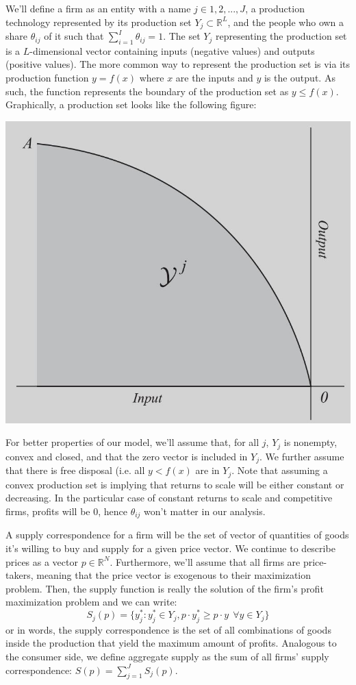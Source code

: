 \documentclass[12pt]{report}
\begin{document}
We'll define a firm as an entity with a name $j\in 1,2,..., J$, a production technology represented by its production set $Y_j \subset \mathbb{R}^L$, and the people who own a share $\theta_{ij}$ of it such that $\sum_{i=1}^{I} \theta_{ij} = 1 $. The set $Y_j$ representing the production set is a $L$-dimensional vector containing inputs (negative values) and outputs (positive values). The more common way to represent the production set is via its production function $y = f(x)$ where $x$ are the inputs and $y$ is the output. As such, the function represents the boundary of the production set as $y \leq f(x)$. Graphically, a production set looks like the following figure:\begin{center}
 \includegraphics[scale=0.25]{IMAGES/prodset.JPG}
 \end{center} 

For better properties of our model, we'll assume that, for all $j$, $Y_j$ is nonempty, convex and closed, and that the zero vector is included in $Y_j$. We further assume that there is free disposal (i.e. all $y < f(x)$ are in $Y_j$. Note that assuming a convex production set is implying that returns to scale will be either constant or decreasing. In the particular case of constant returns to scale and competitive firms, profits will be 0, hence $\theta_{ij}$ won't matter in our analysis.

A supply correspondence for a firm will be the set of vector of quantities of goods it's willing to buy and supply for a given price vector. We continue to describe prices as a vector $p\in\mathbb{R}^N$. Furthermore, we'll assume that all firms are price-takers, meaning that the price vector is exogenous to their maximization problem. Then, the supply function is really the solution of the firm's profit maximization problem and we can write: $$ S_j(p) = \{ y_j^* : y_j^*\in Y_j, p\cdot y_j^*\geq p\cdot y \ \ \forall y\in Y_j\} $$ or in words, the supply correspondence is the set of all combinations of goods inside the production that yield the maximum amount of profits. Analogous to the consumer side, we define aggregate supply as the sum of all firms' supply correspondence: $S(p) = \sum_{j=1}^{J} S_j(p) $. 
\end{document}
